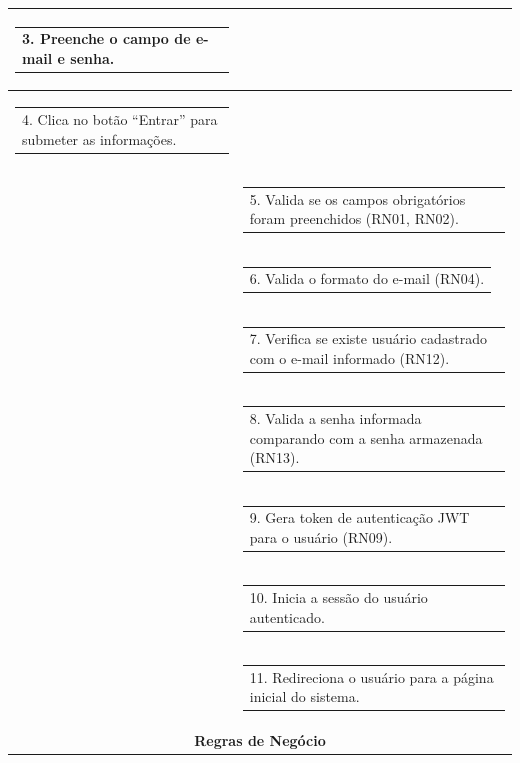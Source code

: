 \begin{longtable}[c]{|p{}|p{}|}
\multicolumn{1}{|p{0.48\textwidth}|}{\begin{tabular}[c]{@{}p{}@{}}3. Preenche o campo de e-mail e senha.\end{tabular}} &
   \\ \hline
\multicolumn{1}{|p{0.48\textwidth}|}{\begin{tabular}[c]{@{}p{}@{}}4. Clica no botão ``Entrar'' para submeter as informações.\end{tabular}} &
   \\ \hline
\multicolumn{1}{|p{0.48\textwidth}|}{} &
  \begin{tabular}[c]{@{}p{}@{}}5. Valida se os campos obrigatórios foram preenchidos (RN01, RN02).\end{tabular} \\ \hline
\multicolumn{1}{|p{0.48\textwidth}|}{} &
  \begin{tabular}[c]{@{}p{}@{}}6. Valida o formato do e-mail (RN04).\end{tabular} \\ \hline
\multicolumn{1}{|p{0.48\textwidth}|}{} &
  \begin{tabular}[c]{@{}p{}@{}}7. Verifica se existe usuário cadastrado com o e-mail informado (RN12).\end{tabular} \\ \hline
\multicolumn{1}{|p{0.48\textwidth}|}{} &
  \begin{tabular}[c]{@{}p{}@{}}8. Valida a senha informada comparando com a senha armazenada (RN13).\end{tabular} \\ \hline
\multicolumn{1}{|p{0.48\textwidth}|}{} &
  \begin{tabular}[c]{@{}p{}@{}}9. Gera token de autenticação JWT para o usuário (RN09).\end{tabular} \\ \hline
\multicolumn{1}{|p{0.48\textwidth}|}{} &
  \begin{tabular}[c]{@{}p{}@{}}10. Inicia a sessão do usuário autenticado.\end{tabular} \\ \hline
\multicolumn{1}{|p{0.48\textwidth}|}{} &
  \begin{tabular}[c]{@{}p{}@{}}11. Redireciona o usuário para a página inicial do sistema.\end{tabular} \\ \hline
\multicolumn{2}{|c|}{\textbf{Regras de Negócio}} \\ \hline

\end{longtable}
